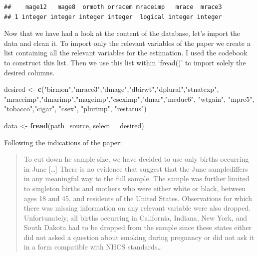 \documentclass[]{book}
\newenvironment{Shaded}{\begin{snugshade}}{\end{snugshade}}
\newcommand{\KeywordTok}[1]{\textcolor[rgb]{0.13,0.29,0.53}{\textbf{#1}}}
\newcommand{\DataTypeTok}[1]{\textcolor[rgb]{0.13,0.29,0.53}{#1}}
\newcommand{\DecValTok}[1]{\textcolor[rgb]{0.00,0.00,0.81}{#1}}
\newcommand{\StringTok}[1]{\textcolor[rgb]{0.31,0.60,0.02}{#1}}
\newcommand{\OperatorTok}[1]{\textcolor[rgb]{0.81,0.36,0.00}{\textbf{#1}}}
\newcommand{\NormalTok}[1]{#1}
\begin{document}
\begin{Shaded}
\end{Shaded}

\begin{verbatim}
##    mage12   mage8  ormoth orracem mraceimp   mrace  mrace3
## 1 integer integer integer integer  logical integer integer
\end{verbatim}

Now that we have had a look at the content of the database, let's import
the data and clean it. To import only the relevant variables of the
paper we create a list containing all the relevant variables for the
estimation. I used the codebook to construct this list. Then we use this
list within `fread()' to import solely the desired columns.

\begin{Shaded}
\begin{Highlighting}[]
\NormalTok{desired <-}\StringTok{ }\KeywordTok{c}\NormalTok{(}\StringTok{"birmon"}\NormalTok{,}\StringTok{"mrace3"}\NormalTok{,}\StringTok{"dmage"}\NormalTok{,}\StringTok{"dbirwt"}\NormalTok{,}\StringTok{"dplural"}\NormalTok{,}\StringTok{"stnatexp"}\NormalTok{,}
             \StringTok{"mraceimp"}\NormalTok{,}\StringTok{"dmarimp"}\NormalTok{,}\StringTok{"mageimp"}\NormalTok{,}\StringTok{"cseximp"}\NormalTok{,}\StringTok{"dmar"}\NormalTok{,}\StringTok{"meduc6"}\NormalTok{, }
             \StringTok{"wtgain"}\NormalTok{, }\StringTok{"mpre5"}\NormalTok{, }\StringTok{"tobacco"}\NormalTok{,}\StringTok{"cigar"}\NormalTok{, }\StringTok{"csex"}\NormalTok{, }\StringTok{"plurimp"}\NormalTok{, }\StringTok{"restatus"}\NormalTok{)}

\NormalTok{data <-}\StringTok{ }\KeywordTok{fread}\NormalTok{(path_source, }\DataTypeTok{select =}\NormalTok{ desired)}
\end{Highlighting}
\end{Shaded}

Following the indications of the paper:

\begin{quote}
To cut down he sample size, we have decided to use only births occurring
in June {[}\ldots{}{]} There is no evidence that suggest that the June
samplediffers in any meaningful way to the full sample. The sample was
further limited to singleton births and mothers who were either white or
black, between ages 18 and 45, and residents of the United States.
Observations for which there was missing information on any relevant
variable were also dropped. Unfortunately, all births occurring in
California, Indiana, New York, and South Dakota had to be dropped from
the sample since these states either did not asked a question about
smoking during pregnancy or did not ask it in a form compatible with
NHCS standards\ldots{}
\end{quote}
\end{document}
